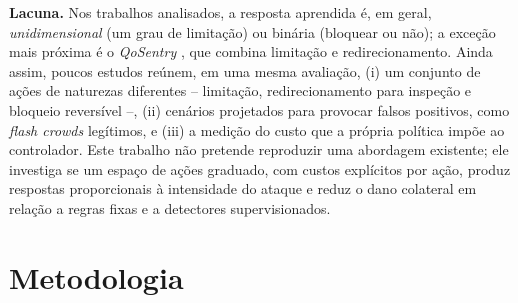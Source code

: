 \documentclass[12pt]{article}
\begin{document}
\textbf{Lacuna.} Nos trabalhos analisados, a resposta aprendida é, em geral,
\emph{unidimensional} (um grau de limitação) ou binária (bloquear ou não); a
exceção mais próxima é o \textit{QoSentry} \cite{khozam2025qosentry}, que
combina limitação e redirecionamento. Ainda assim, poucos estudos reúnem, em
uma mesma avaliação, (i) um conjunto de ações de
naturezas diferentes -- limitação, redirecionamento para inspeção e bloqueio
reversível --, (ii) cenários projetados para provocar falsos positivos, como
\textit{flash crowds} legítimos, e (iii) a medição do custo que a própria
política impõe ao controlador. Este trabalho não pretende reproduzir uma
abordagem existente; ele investiga se um espaço de ações graduado, com custos
explícitos por ação, produz respostas proporcionais à intensidade do ataque e
reduz o dano colateral em relação a regras fixas e a detectores
supervisionados.

\section{Metodologia}\label{sec:metodologia}
\end{document}
